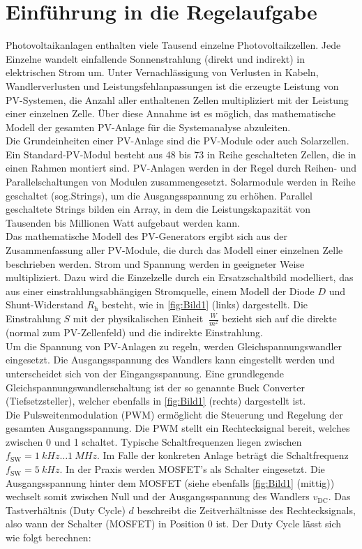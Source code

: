 \section{Einführung in die Regelaufgabe} \label{sec:Einfuehrung}

Photovoltaikanlagen enthalten viele Tausend einzelne Photovoltaikzellen. Jede Einzelne wandelt einfallende Sonnenstrahlung (direkt und indirekt) in elektrischen Strom um. Unter Vernachlässigung von Verlusten in Kabeln, Wandlerverlusten und Leistungsfehlanpassungen ist die erzeugte Leistung von PV-Systemen, die Anzahl aller enthaltenen Zellen multipliziert mit der Leistung einer einzelnen Zelle. Über diese Annahme ist es möglich, das mathematische Modell der gesamten PV-Anlage für die Systemanalyse abzuleiten. \\
Die Grundeinheiten einer PV-Anlage sind die PV-Module oder auch Solarzellen. Ein Standard-PV-Modul besteht aus 48 bis 73 in Reihe geschalteten Zellen, die in einen Rahmen montiert sind. PV-Anlagen werden in der Regel durch Reihen- und Parallelschaltungen von Modulen zusammengesetzt. Solarmodule werden in Reihe geschaltet (sog.\xspace \glqq Strings\grqq{}), um die Ausgangsspannung zu erhöhen. Parallel geschaltete Strings bilden ein \glqq Array\grqq{}, in dem die Leistungskapazität von Tausenden bis Millionen Watt aufgebaut werden kann. \\
Das mathematische Modell des PV-Generators ergibt sich aus der Zusammenfassung aller PV-Module, die durch das Modell einer einzelnen Zelle beschrieben werden. Strom und Spannung werden in geeigneter Weise multipliziert. Dazu wird die Einzelzelle durch ein Ersatzschaltbild modelliert, das aus einer einstrahlungsabhängigen Stromquelle, einem Modell der Diode $D$ und Shunt-Widerstand $R_{\mathrm{h}}$ besteht, wie in \autoref{fig:Bild1} (links) dargestellt. Die Einstrahlung $S$ mit der physikalischen Einheit $\SI{}{\frac{W}{m^2}}$ bezieht sich auf die direkte (normal zum PV-Zellenfeld) und die indirekte Einstrahlung. \\
\newline
Um die Spannung von PV-Anlagen zu regeln, werden Gleichspannungswandler eingesetzt. Die Ausgangsspannung des Wandlers kann eingestellt werden und unterscheidet sich von der Eingangsspannung. Eine grundlegende Gleichspannungswandlerschaltung ist der so genannte Buck Converter (Tiefsetzsteller), welcher ebenfalls in \autoref{fig:Bild1} (rechts) dargestellt ist. \\
Die Pulsweitenmodulation (PWM) ermöglicht die Steuerung und Regelung der gesamten Ausgangsspannung. Die PWM stellt ein Rechtecksignal bereit, welches zwischen 0 und 1 schaltet. Typische Schaltfrequenzen liegen zwischen $f_{\mathrm{SW}} = \SI{1}{kHz} \ldots \SI{1}{MHz}$. Im Falle der konkreten Anlage beträgt die Schaltfrequenz $f_{\mathrm{SW}} = \SI{5}{kHz}$. In der Praxis werden \zB MOSFET's als Schalter eingesetzt. Die Ausgangsspannung hinter dem MOSFET (siehe ebenfalls \autoref{fig:Bild1} (mittig)) wechselt somit zwischen Null und der Ausgangsspannung des Wandlers $v_{\mathrm{DC}}$. Das Tastverhältnis (Duty Cycle) $d$ beschreibt die Zeitverhältnisse des Rechtecksignals, also wann der Schalter (MOSFET) in Position 0  ist. Der Duty Cycle lässt sich wie folgt berechnen:

